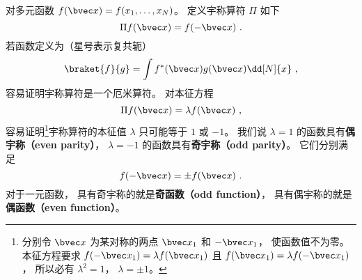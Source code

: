 

对多元函数 $f(\bvec x) = f(x_1, \dots, x_N)$。  定义宇称算符 $\Pi$ 如下
\begin{equation}
\Pi f(\bvec x) = f(-\bvec x)~.
\end{equation}
若函数定义为（星号表示复共轭）
\begin{equation}
\braket{f}{g} = \int f^*(\bvec x) g(\bvec x) \dd[N]{x}~,
\end{equation}
容易证明宇称算符是一个厄米算符。%
对本征方程
\begin{equation}
\Pi f(\bvec x) = \lambda f(\bvec x)~,
\end{equation}
容易证明\footnote{分别令 $\bvec x$ 为某对称的两点 $\bvec x_1$ 和 $-\bvec x_1$， 使函数值不为零。 本征方程要求 $f(-\bvec x_1) = \lambda f(\bvec x_1)$ 且 $f(\bvec x_1) = \lambda f(-\bvec x_1)$， 所以必有 $\lambda^2 = 1$， $\lambda = \pm 1$。}宇称算符的本征值 $\lambda$ 只可能等于 $1$ 或 $-1$。 我们说 $\lambda = 1$ 的函数具有\textbf{偶宇称（even parity）}， $\lambda = -1$ 的函数具有\textbf{奇宇称（odd parity）}。 它们分别满足
\begin{equation}
f(-\bvec x) = \pm f(\bvec x)~.
\end{equation}
对于一元函数， 具有奇宇称的就是\textbf{奇函数（odd function）}， 具有偶宇称的就是\textbf{偶函数（even function）}。
